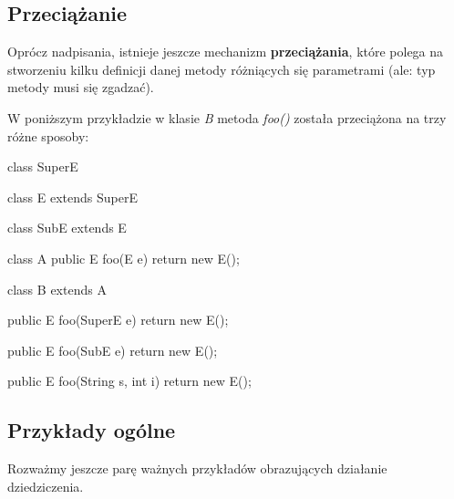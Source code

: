 \subsection{Przeciążanie}
Oprócz nadpisania, istnieje jeszcze mechanizm \textbf{przeciążania}, które polega na stworzeniu kilku definicji danej metody różniących się parametrami (ale: typ metody musi się zgadzać).

\begin{example}
    W poniższym przykładzie w klasie \textit{B} metoda \textit{foo()} została przeciążona na trzy różne sposoby:
    \begin{java}
        class SuperE {}
        
        class E extends SuperE {}
    
        class SubE extends E {}
    
        class A {
            public E foo(E e) {
                return new E();
            }
        }
        
        class B extends A {
 
            public E foo(SuperE e) {
                return new E();
            }

            public E foo(SubE e) {
                return new E();
            }

            public E foo(String s, int i) {
                return new E();
            }
        }
    \end{java}
\end{example}

\subsection{Przykłady ogólne}
Rozważmy jeszcze parę ważnych przykładów obrazujących działanie dziedziczenia.

